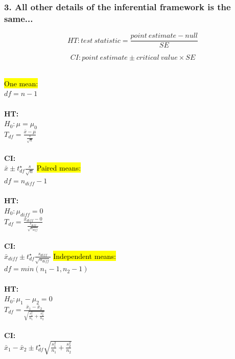 \documentclass[11pt,containsverbatim,handout,xcolor=xelatex,dvipsnames,table]{beamer}
\begin{document}
\begin{frame}
\frametitle{3. All other details of the inferential framework is the same...}

\[ HT: test~statistic = \frac{point~estimate - null}{SE} \]

\pause

\[ CI: point~estimate \pm critical~value \times SE \]

\pause

$\:$ \\

{
\hl{One mean:} \\
{\small $df = n - 1$} \\
$\:$ \\
\textbf{HT:} \\
$H_0: \mu = \mu_0$ \\
$T_{df} = \frac{\bar{x} - \mu}{\frac{s}{\sqrt{n}}}$ \\
$\:$ \\
\textbf{CI:} \\
$\bar{x} \pm t^\star_{df} \frac{s}{\sqrt{n}}$
}
{\pause
\hl{Paired means:} \\
{\small $df = n_{diff} - 1$}
$\:$ \\$\:$ \\
\textbf{HT:} \\
$H_0: \mu_{diff} = 0$ \\
$T_{df} = \frac{\bar{x}_{diff} -0}{\frac{s_{diff}}{\sqrt{n_{diff}}}}$ \\
$\:$ \\
\textbf{CI:} \\
$\bar{x}_{diff} \pm t^\star_{df} \frac{s_{diff}}{\sqrt{n_{diff}}}$
}
{\pause
\hl{Independent means:} \\
{\small $df = min(n_1 - 1, n_2 - 1)$}
$\:$ \\$\:$ \\
\textbf{HT:} \\
$H_0: \mu_1 - \mu_2 = 0$ \\
$T_{df} = \frac{\bar{x}_1 - \bar{x}_2}{\sqrt{ \frac{s_1^2}{n_1} + \frac{s_2^2}{n_2} }}$ \\
$\:$ \\
\textbf{CI:} \\
$\bar{x}_1 - \bar{x}_2 \pm t^\star_{df} \sqrt{ \frac{s_1^2}{n_1} + \frac{s_2^2}{n_2} }$
}

\end{frame}

\end{document}
